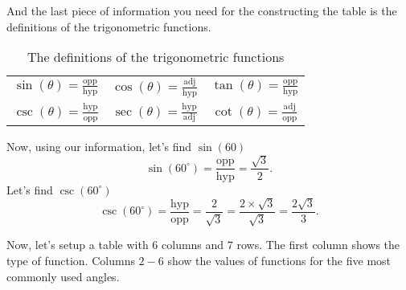 And the last piece of information you need for the constructing the table is
the definitions of the trigonometric functions.

\begin{table}[htpb]
	\centering

	\begin{tabular}{ccc}
		$\displaystyle \sin(\theta) = \frac{\textrm{opp}}{\textrm{hyp}}$ & $\displaystyle \cos(\theta) = \frac{\textrm{adj}}{\textrm{hyp}}$ & $\displaystyle \tan(\theta) = \frac{\textrm{opp}}{\textrm{hyp}}$ \\
		$\displaystyle \csc(\theta) = \frac{\textrm{hyp}}{\textrm{opp}}$ & $\displaystyle \sec(\theta) = \frac{\textrm{hyp}}{\textrm{adj}}$ & $\displaystyle \cot(\theta) = \frac{\textrm{adj}}{\textrm{opp}}$ \\
	\end{tabular}

	\caption{The definitions of the trigonometric functions}
	\label{tab:the_definition_of_the_trigonometric_functions}
\end{table}

\begin{example}
	\label{exm:find_the_value_of_sin_of_60_degrees}

	Now, using our information, let's find $\sin(60)$
	\[%
		\sin(60^{\circ}) = \frac{\textrm{opp}}{\textrm{hyp}} = \frac{\sqrt{3}}{2}
  .\]%
	Let's find $\csc(60^{\circ})$
	\[%
		\csc(60^{\circ}) = \frac{\textrm{hyp}}{\textrm{opp}} = \frac{2}{\sqrt{3}} = \frac{2 \times \sqrt{3}}{\sqrt{3}} = \frac{2\sqrt{3}}{3}
  .\]%
\end{example}

Now, let's setup a table with $6$ columns and $7$ rows. The first column shows
the type of function. Columns $2-6$ show the values of functions for the five
most commonly used angles.

